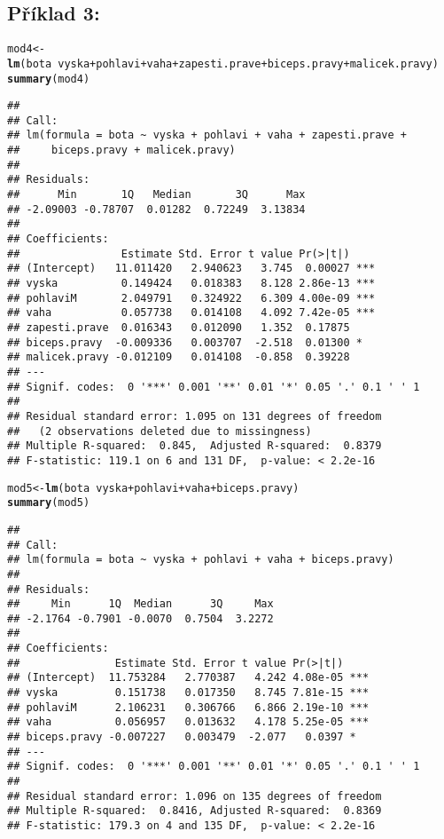 \documentclass[twoside]{article}\usepackage[]{graphicx}\usepackage[]{color}
\makeatletter
\newcommand{\hlopt}[1]{\textcolor[rgb]{0,0,0}{#1}}%
\newcommand{\hlstd}[1]{\textcolor[rgb]{0.345,0.345,0.345}{#1}}%
\newcommand{\hlkwb}[1]{\textcolor[rgb]{0.69,0.353,0.396}{#1}}%
\newcommand{\hlkwd}[1]{\textcolor[rgb]{0.737,0.353,0.396}{\textbf{#1}}}%
\newenvironment{kframe}{%
 \def\at@end@of@kframe{}%
 \ifinner\ifhmode%
  \def\at@end@of@kframe{\end{minipage}}%
  \begin{minipage}{\columnwidth}%
 \fi\fi%
 \def\FrameCommand##1{\hskip\@totalleftmargin \hskip-\fboxsep
 \colorbox{shadecolor}{##1}\hskip-\fboxsep
     \hskip-\linewidth \hskip-\@totalleftmargin \hskip\columnwidth}%
 \MakeFramed {\advance\hsize-\width
   \@totalleftmargin\z@ \linewidth\hsize
   \@setminipage}}%
 {\par\unskip\endMakeFramed%
 \at@end@of@kframe}
\newenvironment{knitrout}{}{} %
\makeatother
\begin{document}
\subsection*{Příklad 3:}
\begin{knitrout}
\color{fgcolor}\begin{kframe}
\begin{alltt}
\hlstd{mod4} \hlkwb{<-} \hlkwd{lm}\hlstd{(bota}\hlopt{~}\hlstd{vyska} \hlopt{+} \hlstd{pohlavi} \hlopt{+} \hlstd{vaha} \hlopt{+} \hlstd{zapesti.prave} \hlopt{+} \hlstd{biceps.pravy} \hlopt{+} \hlstd{malicek.pravy)}
\hlkwd{summary}\hlstd{(mod4)}
\end{alltt}
\begin{verbatim}
## 
## Call:
## lm(formula = bota ~ vyska + pohlavi + vaha + zapesti.prave + 
##     biceps.pravy + malicek.pravy)
## 
## Residuals:
##      Min       1Q   Median       3Q      Max 
## -2.09003 -0.78707  0.01282  0.72249  3.13834 
## 
## Coefficients:
##                Estimate Std. Error t value Pr(>|t|)    
## (Intercept)   11.011420   2.940623   3.745  0.00027 ***
## vyska          0.149424   0.018383   8.128 2.86e-13 ***
## pohlaviM       2.049791   0.324922   6.309 4.00e-09 ***
## vaha           0.057738   0.014108   4.092 7.42e-05 ***
## zapesti.prave  0.016343   0.012090   1.352  0.17875    
## biceps.pravy  -0.009336   0.003707  -2.518  0.01300 *  
## malicek.pravy -0.012109   0.014108  -0.858  0.39228    
## ---
## Signif. codes:  0 '***' 0.001 '**' 0.01 '*' 0.05 '.' 0.1 ' ' 1
## 
## Residual standard error: 1.095 on 131 degrees of freedom
##   (2 observations deleted due to missingness)
## Multiple R-squared:  0.845,	Adjusted R-squared:  0.8379 
## F-statistic: 119.1 on 6 and 131 DF,  p-value: < 2.2e-16
\end{verbatim}
\begin{alltt}
\hlstd{mod5} \hlkwb{<-} \hlkwd{lm}\hlstd{(bota}\hlopt{~}\hlstd{vyska} \hlopt{+} \hlstd{pohlavi} \hlopt{+} \hlstd{vaha} \hlopt{+} \hlstd{biceps.pravy)}
\hlkwd{summary}\hlstd{(mod5)}
\end{alltt}
\begin{verbatim}
## 
## Call:
## lm(formula = bota ~ vyska + pohlavi + vaha + biceps.pravy)
## 
## Residuals:
##     Min      1Q  Median      3Q     Max 
## -2.1764 -0.7901 -0.0070  0.7504  3.2272 
## 
## Coefficients:
##               Estimate Std. Error t value Pr(>|t|)    
## (Intercept)  11.753284   2.770387   4.242 4.08e-05 ***
## vyska         0.151738   0.017350   8.745 7.81e-15 ***
## pohlaviM      2.106231   0.306766   6.866 2.19e-10 ***
## vaha          0.056957   0.013632   4.178 5.25e-05 ***
## biceps.pravy -0.007227   0.003479  -2.077   0.0397 *  
## ---
## Signif. codes:  0 '***' 0.001 '**' 0.01 '*' 0.05 '.' 0.1 ' ' 1
## 
## Residual standard error: 1.096 on 135 degrees of freedom
## Multiple R-squared:  0.8416,	Adjusted R-squared:  0.8369 
## F-statistic: 179.3 on 4 and 135 DF,  p-value: < 2.2e-16
\end{verbatim}
\end{kframe}
\end{knitrout}
\end{document}
